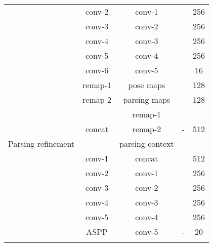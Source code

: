 \documentclass[10pt,journal,compsoc]{IEEEtran}
\begin{document}
\begin{table}[t]
\begin{tabular}{ccccc}
                                       & conv-2    & conv-1        &        &  256     \\
                                       & conv-3    & conv-2        &        &  256     \\
                                       & conv-4    & conv-3        &        &  256     \\
                                       & conv-5    & conv-4        &        &  256     \\
                                       & conv-6    & conv-5        &        &  16     \\ 
\toprule[0.8pt]
   \multirow{9}{*}{Parsing refinement} & remap-1   & pose maps     &        &  128     \\
                                       & remap-2   & parsing maps  &        &  128     \\
                                       & \multirow{3}{*}{concat}   & remap-1          & \multirow{3}{*}{-}  & \multirow{3}{*}{512}  \\
                                       &                           & remap-2          &                     &                       \\
                                       &                           & parsing context   &                     &                       \\
                                       & conv-1    & concat        &        &  512     \\
                                       & conv-2    & conv-1        &        &  256     \\
                                       & conv-3    & conv-2        &        &  256     \\
                                       & conv-4    & conv-3        &        &  256     \\
                                       & conv-5    & conv-4        &        &  256     \\
                                       & ASPP      & conv-5        & -                &  20     \\ 

\toprule[0.8pt]
\vspace{-6mm}
\end{tabular}
\end{table}
\end{document}
